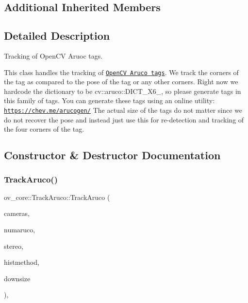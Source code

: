 \subsection*{Additional Inherited Members}


\subsection{Detailed Description}
Tracking of Open\+CV Aruoc tags. 

This class handles the tracking of \href{https://github.com/opencv/opencv_contrib/tree/master/modules/aruco}{\tt Open\+CV Aruco tags}. We track the corners of the tag as compared to the pose of the tag or any other corners. Right now we hardcode the dictionary to be {\ttfamily cv\+::aruco\+::\+D\+I\+C\+T\+\_\+X6\+\_}, so please generate tags in this family of tags. You can generate these tags using an online utility\+: \href{https://chev.me/arucogen/}{\tt https\+://chev.\+me/arucogen/} The actual size of the tags do not matter since we do not recover the pose and instead just use this for re-\/detection and tracking of the four corners of the tag. 

\subsection{Constructor \& Destructor Documentation}
\mbox{\label{classov__core_1_1TrackAruco_adaa89be7ced3917bdedc89d69a2269a4}} 
\subsubsection{\texorpdfstring{Track\+Aruco()}{TrackAruco()}}
{\footnotesize\ttfamily ov\+\_\+core\+::\+Track\+Aruco\+::\+Track\+Aruco (\begin{DoxyParamCaption}\item[{std\+::unordered\+\_\+map$<$ size\+\_\+t, std\+::shared\+\_\+ptr$<$ \hyperlink{classov__core_1_1CamBase}{Cam\+Base} $>$$>$}]{cameras,  }\item[{int}]{numaruco,  }\item[{bool}]{stereo,  }\item[{\hyperlink{classov__core_1_1TrackBase_aa4b34a5dce99b59522d57bf9278c9a1a}{Histogram\+Method}}]{histmethod,  }\item[{bool}]{downsize }\end{DoxyParamCaption})\hspace{0.3cm}{\ttfamily [inline]}, {\ttfamily [explicit]}}



